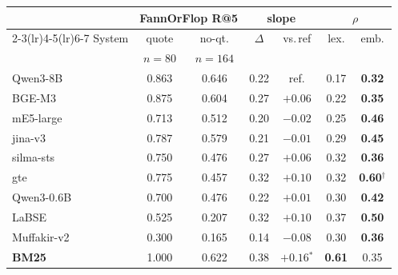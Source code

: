 \begin{tabular}{l cccc cc}
\toprule
& \multicolumn{2}{c}{FannOrFlop R@5} & \multicolumn{2}{c}{slope} & \multicolumn{2}{c}{$\rho$} \\
\cmidrule(lr){2-3}\cmidrule(lr){4-5}\cmidrule(lr){6-7}
System & quote & no-qt. & $\Delta$ & vs.\,ref & lex. & emb. \\
& \scriptsize $n{=}80$ & \scriptsize $n{=}164$ & & & & \\
\midrule
Qwen3-8B & 0.863 & 0.646 & 0.22 & ref. & 0.17 & \textbf{0.32} \\
BGE-M3 & 0.875 & 0.604 & 0.27 & $+0.06$ & 0.22 & \textbf{0.35} \\
mE5-large & 0.713 & 0.512 & 0.20 & $-0.02$ & 0.25 & \textbf{0.46} \\
jina-v3 & 0.787 & 0.579 & 0.21 & $-0.01$ & 0.29 & \textbf{0.45} \\
silma-sts & 0.750 & 0.476 & 0.27 & $+0.06$ & 0.32 & \textbf{0.36} \\
gte & 0.775 & 0.457 & 0.32 & $+0.10$ & 0.32 & \textbf{0.60}$^{\dagger}$ \\
Qwen3-0.6B & 0.700 & 0.476 & 0.22 & $+0.01$ & 0.30 & \textbf{0.42} \\
LaBSE & 0.525 & 0.207 & 0.32 & $+0.10$ & 0.37 & \textbf{0.50} \\
Muffakir-v2 & 0.300 & 0.165 & 0.14 & $-0.08$ & 0.30 & \textbf{0.36} \\
\midrule
\textbf{BM25} & 1.000 & 0.622 & 0.38 & \textbf{$+0.16$$^{*}$} & \textbf{0.61} & 0.35 \\
\bottomrule
\end{tabular}